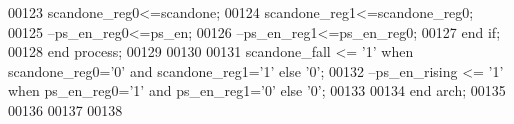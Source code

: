 \begin{DoxyCode}
00123          \textcolor{vhdlchar}{scandone_reg0}\textcolor{vhdlchar}{<=}\textcolor{vhdlchar}{scandone};
00124           \textcolor{vhdlchar}{scandone_reg1}\textcolor{vhdlchar}{<=}\textcolor{vhdlchar}{scandone_reg0};
00125 \textcolor{keyword}{          --ps\_en\_reg0<=ps\_en;}
00126 \textcolor{keyword}{          --ps\_en\_reg1<=ps\_en\_reg0;}
00127         \textcolor{keywordflow}{end} \textcolor{keywordflow}{if};
00128     \textcolor{keywordflow}{end} \textcolor{keywordflow}{process};
00129      
00130      
00131 \textcolor{vhdlchar}{scandone_fall}   \textcolor{vhdlchar}{<=} \textcolor{vhdlchar}{'}\textcolor{vhdllogic}{}\textcolor{vhdllogic}{1}\textcolor{vhdlchar}{'} \textcolor{keywordflow}{when} \textcolor{vhdlchar}{scandone_reg0}\textcolor{vhdlchar}{=}\textcolor{vhdlchar}{'}\textcolor{vhdllogic}{}\textcolor{vhdllogic}{0}\textcolor{vhdlchar}{'} \textcolor{keywordflow}{and} \textcolor{vhdlchar}{scandone_reg1}\textcolor{vhdlchar}{=}\textcolor{vhdlchar}{'}\textcolor{vhdllogic}{}\textcolor{vhdllogic}{1}\textcolor{vhdlchar}{'} \textcolor{keywordflow}{else} \textcolor{vhdlchar}{'}\textcolor{vhdllogic}{}\textcolor{vhdllogic}{0}\textcolor{vhdlchar}{'};
00132 \textcolor{keyword}{--ps\_en\_rising  <= '1' when ps\_en\_reg0='1' and ps\_en\_reg1='0' else '0';}
00133   
00134 \textcolor{keywordflow}{end} \textcolor{vhdlchar}{arch};
00135 
00136 
00137 
00138 
\end{DoxyCode}
